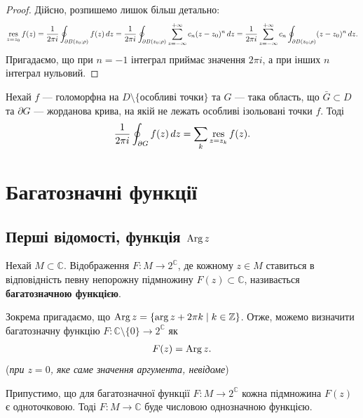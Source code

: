 \documentclass{math_library}
\begin{document}
\begin{proof}
Дійсно, розпишемо лишок більш детально:
\begin{align*}
\operatorname*{res}_{z = z_0} f(z) = \dfrac{1}{2 \pi i} \oint_{\partial B(z_0;\rho)} f(z)\,dz = \dfrac{1}{2\pi i} \oint_{\partial B(z_0;\rho)} \sum_{z=-\infty}^{+\infty} c_n (z-z_0)^n\,dz = \dfrac{1}{2\pi i} \sum_{z=-\infty}^{+\infty} c_n \oint_{\partial B(z_0;\rho)} (z-z_0)^n\,dz.
\end{align*}
Пригадаємо, що при $n = -1$ інтеграл приймає значення $2 \pi i$, а при інших $n$ інтеграл нульовий.
\end{proof}

\begin{theorem}
Нехай $f$ --- голоморфна на $D \setminus \{\text{особливі точки}\}$ та $G$ --- така область, що $\bar{G} \subset D$ та $\partial G$ --- жорданова крива, на якій не лежать особливі ізольовані точки $f$. Тоді
\begin{align*}
\dfrac{1}{2 \pi i} \oint_{\partial G} f(z)\,dz = \sum_k \operatorname*{res}_{z = z_k} f(z).
\end{align*}
\end{theorem}
\newpage

\section{Багатозначні функції}
\subsection{Перші відомості, функція $\operatorname{Arg} z$}
\begin{definition}
Нехай $M \subset \mathbb{C}$. Відображення $F \colon M \to 2^\mathbb{C}$, де кожному $z \in M$ ставиться в відповідність певну  непорожну підмножину $F(z) \subset \mathbb{C}$, називається \textbf{багатозначною функцією}.
\end{definition}

Зокрема пригадаємо, що $\operatorname{Arg} z = \{ \arg z + 2 \pi k \mid k \in \mathbb{Z} \}$. Отже, можемо визначити багатозначну функцію $F \colon \mathbb{C} \setminus \{0\} \to 2^\mathbb{C}$ як
\begin{align*}
F(z) = \operatorname{Arg} z.
\end{align*}
(\textit{при $z = 0$, яке саме значення аргумента, невідоме})

\begin{remark}
Припустимо, що для багатозначної функції $F \colon M \to 2^\mathbb{C}$ кожна підмножина $F(z)$ є одноточковою. Тоді $F \colon M \to \mathbb{C}$ буде числовою однозначною функцією.
\end{remark}
\end{document}
